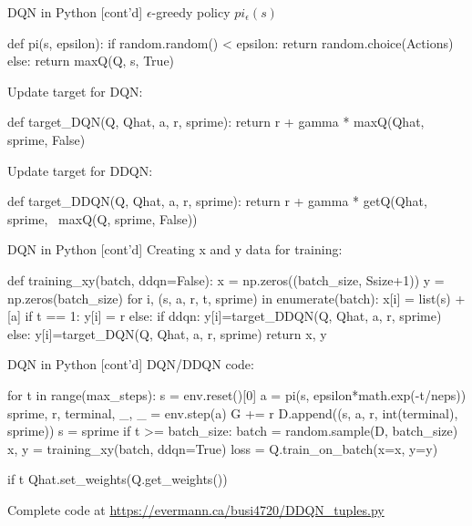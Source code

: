 \documentclass[ignorenonframetext,xcolor=x11names]{beamer}
\begin{document}
\begin{frame}[label=withcode,fragile]{DQN in Python \small [cont'd]}
$\epsilon$-greedy policy $pi_\epsilon(s)$
\begin{pythoncode}
def pi(s, epsilon):
    if random.random() < epsilon:
        return random.choice(Actions)
    else:
        return maxQ(Q, s, True)
\end{pythoncode}
Update target for DQN:
\begin{pythoncode}
def target_DQN(Q, Qhat, a, r, sprime):
    return r + gamma * maxQ(Qhat, sprime, False)
\end{pythoncode}
Update target for DDQN:
\begin{pythoncode}
def target_DDQN(Q, Qhat, a, r, sprime):
    return r + gamma * getQ(Qhat, sprime, \ 
                               maxQ(Q, sprime, False))
\end{pythoncode}
\end{frame}

\begin{frame}[label=withcode,fragile]{DQN in Python \small [cont'd]}
Creating x and y data for training:
\begin{pythoncode}
def training_xy(batch, ddqn=False):
    x = np.zeros((batch_size, Ssize+1))
    y = np.zeros(batch_size)
    for i, (s, a, r, t, sprime) in enumerate(batch):
        x[i] = list(s) + [a]
        if t == 1:
            y[i] = r
        else:
            if ddqn:
                y[i]=target_DDQN(Q, Qhat, a, r, sprime)
            else:
                y[i]=target_DQN(Q, Qhat, a, r, sprime)
    return x, y
\end{pythoncode}
\end{frame}

\begin{frame}[label=withcode,fragile]{DQN in Python \small [cont'd]}
DQN/DDQN code:
\begin{pythoncode}
for t in range(max_steps):
    s = env.reset()[0]
    a = pi(s, epsilon*math.exp(-t/neps))
    sprime, r, terminal, _, _ = env.step(a)
    G += r
    D.append((s, a, r, int(terminal), sprime))
    s = sprime
    if t >= batch_size:
        batch = random.sample(D, batch_size)
        x, y = training_xy(batch, ddqn=True)
        loss = Q.train_on_batch(x=x, y=y)

    if t %
        Qhat.set_weights(Q.get_weights())
\end{pythoncode}

Complete code at \url{https://evermann.ca/busi4720/DDQN_tuples.py}
\end{frame}
\end{document}
